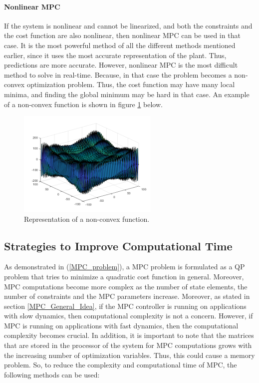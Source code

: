 \documentclass{thesisreport}
\begin{document}
\paragraph{Nonlinear MPC} If the system is nonlinear and cannot be linearized, and both the constraints and the cost function are also nonlinear, then nonlinear MPC can be used in that case. It is the most powerful method of all the different methods mentioned earlier, since it uses the most accurate representation of the plant. Thus, predictions are more accurate. However, nonlinear MPC is the most difficult method to solve in real-time. Because, in that case the problem becomes a non-convex optimization problem. Thus, the cost function may have many local minima, and finding the global minimum may be hard in that case. An example of a non-convex function is shown in figure \ref{nonconvex_function} below.


\begin{figure}[h]
\centering
\includegraphics[width=0.6\textwidth]{Images/Control/MPC_Nonconvex_Equation_b}
\caption{Representation of a non-convex function.}
\label{nonconvex_function}
\end{figure}

\subsection{Strategies to Improve Computational Time}

As demonstrated in (\ref{MPC_problem}), a MPC problem is formulated as a QP problem that tries to minimize a quadratic cost function in general. Moreover, MPC computations become more complex as the number of state elements, the number of constraints and the MPC parameters increase. Moreover, as stated in section \ref{MPC_General_Idea}, if the MPC controller is running on applications with slow dynamics, then computational complexity is not a concern. However, if MPC is running on applications with fast dynamics, then the computational complexity becomes crucial. In addition, it is important to note that the matrices that are stored in the processor of the system for MPC computations grows with the increasing number of optimization variables. Thus, this could cause a memory problem. So, to reduce the complexity and computational time of MPC, the following methods can be used:
\end{document}
